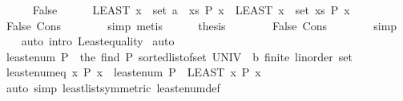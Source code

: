 \begin{isabellebody}
\ \ \ \ \isamarkupfalse%
\ False\isanewline
\ \ \ \ \isamarkupfalse%
\ {\isachardoublequoteopen}{\isacharparenleft}{\kern0pt}LEAST\ x\ {\isasymin}\ set\ {\isacharparenleft}{\kern0pt}a\ {\isacharhash}{\kern0pt}\ xs{\isacharparenright}{\kern0pt}{\isachardot}{\kern0pt}\ P\ x{\isacharparenright}{\kern0pt}\ {\isacharequal}{\kern0pt}\ {\isacharparenleft}{\kern0pt}LEAST\ x\ {\isasymin}\ set\ xs{\isachardot}{\kern0pt}\ P\ x{\isacharparenright}{\kern0pt}{\isachardoublequoteclose}\isanewline
\ \ \ \ \ \ \isamarkupfalse%
\ False\ Cons{\isacharparenleft}{\kern0pt}{}{\isacharparenright}{\kern0pt}\isanewline
\ \ \ \ \ \ \isamarkupfalse%
\ simp\ metis\isanewline
\ \ \ \ \isamarkupfalse%
\ {\isacharquery}{\kern0pt}thesis\isanewline
\ \ \ \ \ \ \isamarkupfalse%
\ False\ Cons\isanewline
\ \ \ \ \ \ \isamarkupfalse%
\ simp\isanewline
\ \ \isamarkupfalse%
\ {\isacharparenleft}{\kern0pt}auto\ intro{\isacharcolon}{\kern0pt}\ Least{\isacharunderscore}{\kern0pt}equality{\isacharparenright}{\kern0pt}\isanewline
{}\isamarkupfalse%
\ auto%
\endisatagproof
{\isafoldproof}%
%
\isadelimproof
\isanewline
%
\endisadelimproof
\isanewline
{}\isamarkupfalse%
\ {\isachardoublequoteopen}least{\isacharunderscore}{\kern0pt}enum\ P\ {\isacharequal}{\kern0pt}\ the\ {\isacharparenleft}{\kern0pt}find\ P\ {\isacharparenleft}{\kern0pt}sorted{\isacharunderscore}{\kern0pt}list{\isacharunderscore}{\kern0pt}of{\isacharunderscore}{\kern0pt}set\ {\isacharparenleft}{\kern0pt}UNIV\ {\isacharcolon}{\kern0pt}{\isacharcolon}{\kern0pt}\ {\isacharparenleft}{\kern0pt}{\isacharprime}{\kern0pt}b{\isacharcolon}{\kern0pt}{\isacharcolon}{\kern0pt}\ {\isacharbraceleft}{\kern0pt}finite{\isacharcomma}{\kern0pt}\ linorder{\isacharbraceright}{\kern0pt}{\isacharparenright}{\kern0pt}\ set{\isacharparenright}{\kern0pt}{\isacharparenright}{\kern0pt}{\isacharparenright}{\kern0pt}{\isachardoublequoteclose}\isanewline
\isanewline
{}\isamarkupfalse%
\ least{\isacharunderscore}{\kern0pt}enum{\isacharunderscore}{\kern0pt}eq{\isacharcolon}{\kern0pt}\ {\isachardoublequoteopen}{\isasymexists}x{\isachardot}{\kern0pt}\ P\ x\ {\isasymLongrightarrow}\ least{\isacharunderscore}{\kern0pt}enum\ P\ {\isacharequal}{\kern0pt}\ {\isacharparenleft}{\kern0pt}LEAST\ x{\isachardot}{\kern0pt}\ P\ x{\isacharparenright}{\kern0pt}{\isachardoublequoteclose}\isanewline
%
\isadelimproof
\ \ %
\endisadelimproof
%
\isatagproof
{}\isamarkupfalse%
\ {\isacharparenleft}{\kern0pt}auto\ simp{\isacharcolon}{\kern0pt}\ least{\isacharunderscore}{\kern0pt}list{\isacharbrackleft}{\kern0pt}symmetric{\isacharbrackright}{\kern0pt}\ least{\isacharunderscore}{\kern0pt}enum{\isacharunderscore}{\kern0pt}def{\isacharparenright}{\kern0pt}%

\end{isabellebody}
